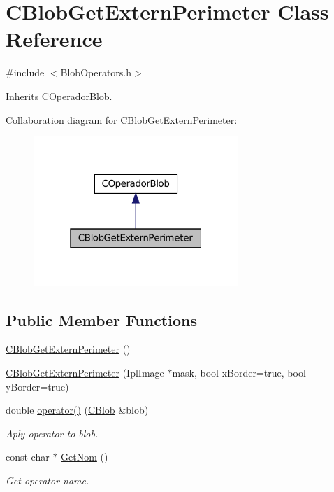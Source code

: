 \hypertarget{class_c_blob_get_extern_perimeter}{
\section{CBlobGetExternPerimeter Class Reference}
\label{class_c_blob_get_extern_perimeter}
}


{\ttfamily \#include $<$BlobOperators.h$>$}



Inherits \hyperlink{class_c_operador_blob}{COperadorBlob}.



Collaboration diagram for CBlobGetExternPerimeter:
\nopagebreak
\begin{figure}[H]
\begin{center}
\leavevmode
\includegraphics[width=220pt]{class_c_blob_get_extern_perimeter__coll__graph}
\end{center}
\end{figure}
\subsection*{Public Member Functions}
\begin{DoxyCompactItemize}
\item 
\hyperlink{class_c_blob_get_extern_perimeter_ab3118e7b8f6b8601dd119b3e4f089b7d}{CBlobGetExternPerimeter} ()
\item 
\hyperlink{class_c_blob_get_extern_perimeter_ad4251d3c3231b4ef304796395d27d7fc}{CBlobGetExternPerimeter} (IplImage $\ast$mask, bool xBorder=true, bool yBorder=true)
\item 
double \hyperlink{class_c_blob_get_extern_perimeter_a3c506f7355bab0299f1992dcda2e0a0a}{operator()} (\hyperlink{class_c_blob}{CBlob} \&blob)
\begin{DoxyCompactList}\small\item\em Aply operator to blob. \item\end{DoxyCompactList}\item 
const char $\ast$ \hyperlink{class_c_blob_get_extern_perimeter_a0565de9fba118d0de191359934fb59d0}{GetNom} ()
\begin{DoxyCompactList}\small\item\em Get operator name. \item\end{DoxyCompactList}\end{DoxyCompactItemize}


